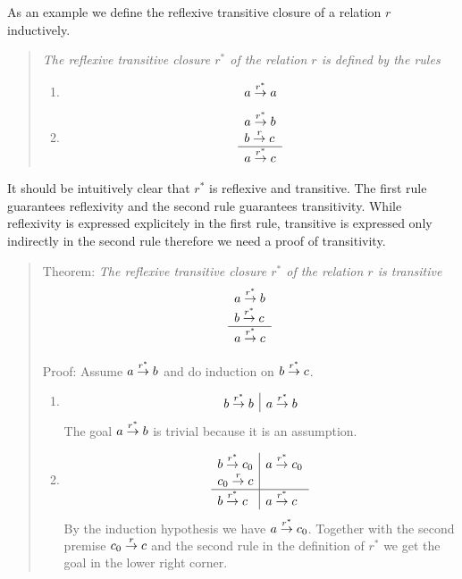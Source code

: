 As an example we define the reflexive transitive closure of a relation $r$
inductively.

\begin{quote}
    \emph{The reflexive transitive closure $r^*$ of the relation $r$ is defined
    by the rules}
    \begin{enumerate}
    \item
        $$ a \stackrel{r^*}{\to} a $$

    \item
        $$
        \begin{array}{l} 
            a \stackrel{r^*}{\to} b
            \\
            b \stackrel{r}{\to} c
         \\ \hline 
            a \stackrel{r^*}{\to} c
        \end{array}
        $$
    \end{enumerate}
\end{quote}


It should be intuitively clear that $r^*$ is reflexive and transitive. The first
rule guarantees reflexivity and the second rule guarantees transitivity. While
reflexivity is expressed explicitely in the first rule, transitive is expressed
only indirectly in the second rule therefore we need a proof of transitivity.

\begin{quote}
    \def\rstar{{r^*}}

    Theorem: \emph{The reflexive transitive closure $r^*$ of the relation $r$ is
    transitive}
    $$
    \rulev{
        a \torel\rstar b
        \\
        b \torel\rstar c
    }
    {
        a \torel\rstar c
    }
    $$

    Proof: Assume $a \torel\rstar b$ and do induction on $b \torel\rstar c$.
    \begin{enumerate}
    \item
        $$
        \begin{array}{l|l}
            b \torel\rstar b
            &
            a \torel\rstar b
        \end{array}
        $$
    The goal $a \torel\rstar b$ is trivial because it is an assumption.

    \item
        $$
        \begin{array}{l|l}
            b \torel\rstar c_0
            &
            a \torel\rstar c_0
            \\
            c_0 \torel r c
            \\
            \hline
            b \torel\rstar c
            &
            a \torel\rstar c
        \end{array}
        $$
        By the induction hypothesis we have $a \torel\rstar c_0$. Together with
        the second premise $c_0 \stackrel{r}{\to} c$ and the second rule in the
        definition of $\rstar$ we get the goal in the lower right corner.
    \end{enumerate}
\end{quote}





